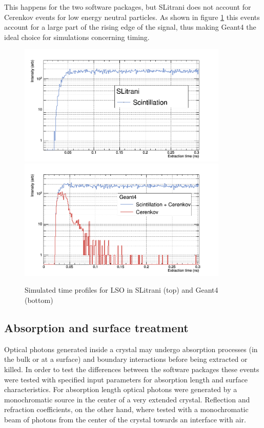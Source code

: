 This happens for the two software packages, but SLitrani does not account for Cerenkov events for low energy neutral particles. As shown in figure \ref{fig:scint_cer} this events account for a large part of the rising edge of the signal, thus making Geant4 the ideal choice for simulations concerning timing.
\begin{figure}[htbp]
\begin{center}
\includegraphics[width=10cm]{../Pictures/Chapter_5/scint_time_ex.png}
\includegraphics[width=10cm]{../Pictures/Chapter_5/sum_time_ex.png}
\end{center}
\caption[Simulated time profiles for LSO]{Simulated time profiles for LSO in SLitrani (top) and Geant4 (bottom)}
\label{fig:scint_cer}
\end{figure}

\subsection{Absorption and surface treatment}
Optical photons generated inside a crystal may undergo absorption processes (in the bulk or at a surface) and boundary interactions before being extracted or killed.
In order to test the differences between the software packages these events were tested with specified input parameters for absorption length and surface characteristics.
For absorption length optical photons were generated by a monochromatic source in the center of a very extended crystal. Reflection and refraction coefficients, on the other hand, where tested with a monochromatic beam of photons from the center of the crystal towards an interface with air.

